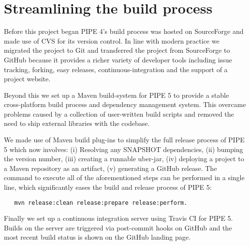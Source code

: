 \section{Streamlining the build process}
Before this project began PIPE 4's build process was hosted on SourceForge and made use of CVS for its version control. In line with modern practice we migrated the project to Git and transferred the project from SourceForge to GitHub because it provides a richer variety of developer tools including issue tracking, forking, easy releases, continuous-integration and the support of a project website.


Beyond this we set up a Maven build-system for PIPE 5 to provide a stable cross-platform build process and dependency management system. This overcame problems caused by a collection of user-written build scripts and removed the need to ship external libraries with the codebase.

We made use of Maven build plug-ins to simplify the full release process of PIPE 5 which now involves: (i) Resolving any SNAPSHOT dependencies, (ii) bumping the version number, (iii) creating a runnable uber-jar, (iv) deploying a project to a Maven repository as an artifact, (v) generating a GitHub release. The command to execute all of the aforementioned steps can be performed in a single line, which significantly eases the build and release process of PIPE 5:
\begin{lstlisting}
   mvn release:clean release:prepare release:perform.
\end{lstlisting}

Finally we set up a continuous integration server using Travis CI for PIPE 5. Builds on the server are triggered via post-commit hooks on GitHub and the most recent build status is shown on the GitHub landing page.
\clearpage
